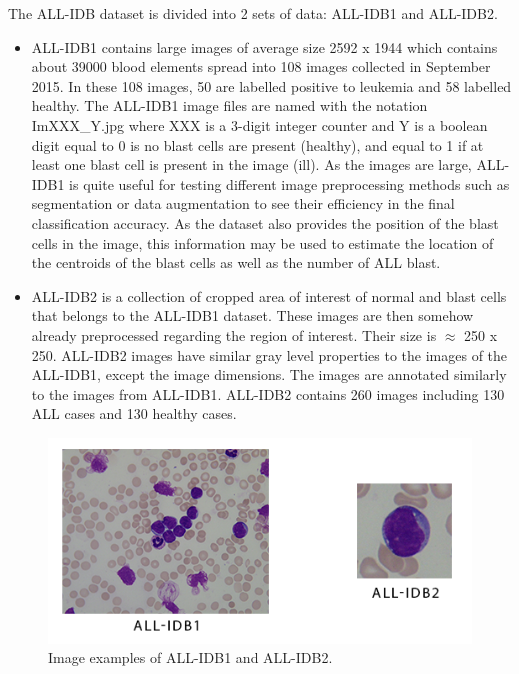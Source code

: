 \documentclass[11pt, openany]{report}
\theoremstyle{plain}
\theoremstyle{definition}
\theoremstyle{remark}
\begin{document}
The ALL-IDB dataset is divided into 2 sets of data: ALL-IDB1 and ALL-IDB2. 
\begin{itemize}
\item ALL-IDB1 contains large images of average size 2592 x 1944 which contains about 39000 blood elements spread into 108 images collected in September 2015. In these 108 images, 50 are labelled positive to leukemia and 58 labelled healthy. The ALL-IDB1 image files are named with the notation ImXXX\_Y.jpg where XXX is a 3-digit integer counter and Y is a boolean digit equal to 0 is no blast cells are present (healthy), and equal to 1 if at least one blast cell is present in the image (ill). As the images are large, ALL-IDB1 is quite useful for testing different image preprocessing methods such as segmentation or data augmentation to see their efficiency in the final classification accuracy.  As the dataset also provides the position of the blast cells in the image, this information may be used to estimate the location of the centroids of the blast cells as well as the number of ALL blast.  

\item ALL-IDB2 is a collection of cropped area of interest of normal and blast cells that belongs to the ALL-IDB1 dataset. These images are then somehow already preprocessed regarding the region of interest. Their size is $\approx$ 250 x 250. ALL-IDB2 images have similar gray level properties to the images of the ALL-IDB1, except the image dimensions. The images are annotated similarly to the images from ALL-IDB1. ALL-IDB2 contains 260 images including 130 ALL cases and 130 healthy cases.  
\end{itemize}


\begin{figure}[H]
  \centering
  \includegraphics[scale=1]{figures/all-idb.PNG}
  \caption{Image examples of ALL-IDB1 and ALL-IDB2.}
  \label{fig:all-idb}
\end{figure}
\end{document}

